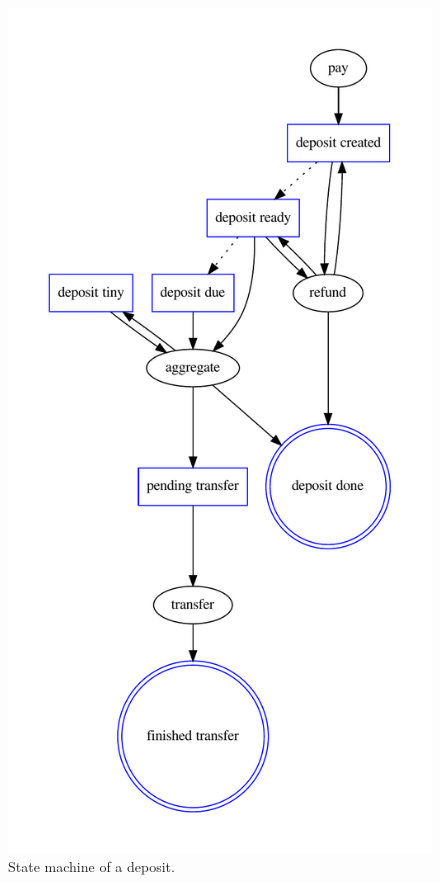 \begin{figure}
  \begin{center}
    \includegraphics[scale=0.8]{taler/deposit.pdf}
  \end{center}
  \caption{State machine of a deposit.}
  \label{fig:deposit:states}
\end{figure}


